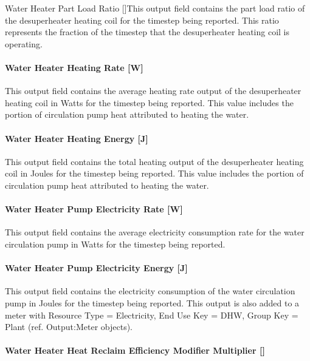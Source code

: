 Water Heater Part Load Ratio {[]}This output field contains the part load ratio of the desuperheater heating coil for the timestep being reported. This ratio represents the fraction of the timestep that the desuperheater heating coil is operating.

\paragraph{Water Heater Heating Rate {[}W{]}}\label{water-heater-heating-rate-w}

This output field contains the average heating rate output of the desuperheater heating coil in Watts for the timestep being reported. This value includes the portion of circulation pump heat attributed to heating the water.

\paragraph{Water Heater Heating Energy {[}J{]}}\label{water-heater-heating-energy-j}

This output field contains the total heating output of the desuperheater heating coil in Joules for the timestep being reported. This value includes the portion of circulation pump heat attributed to heating the water.

\paragraph{Water Heater Pump Electricity Rate {[}W{]}}\label{water-heater-pump-electric-power-w}

This output field contains the average electricity consumption rate for the water circulation pump in Watts for the timestep being reported.

\paragraph{Water Heater Pump Electricity Energy {[}J{]}}\label{water-heater-pump-electric-energy-j}

This output field contains the electricity consumption of the water circulation pump in Joules for the timestep being reported. This output is also added to a meter with Resource Type = Electricity, End Use Key = DHW, Group Key = Plant (ref. Output:Meter objects).

\paragraph{Water Heater Heat Reclaim Efficiency Modifier Multiplier {[]}}\label{water-heater-heat-reclaim-efficiency-modifier-multiplier}

